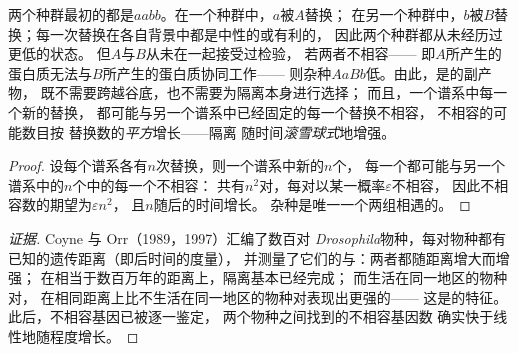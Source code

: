 \begin{theorem}\label{thm:b2:speciation:dm}
两个种群最初的都是$aabb$。在一个种群中，$a$被$A$替换；
在另一个种群中，$b$被$B$替换；每一次替换在各自背景中都是中性的或有利的，
因此两个种群都从未经历过更低的状态。
但$A$与$B$从未在一起接受过检验，
若两者不相容——
即$A$所产生的蛋白质无法与$B$所产生的蛋白质协同工作——
则杂种$AaBb$低。由此，是的副产物，
既不需要跨越谷底，也不需要为隔离本身进行选择；
而且，一个谱系中每一个新的替换，
都可能与另一个谱系中已经固定的每一个替换不相容，
不相容的可能数目按
替换数的\emph{平方}增长——隔离
随时间\emph{滚雪球式}地增强。
\end{theorem}
\begin{proof}
设每个谱系各有$n$次替换，则一个谱系中新的$n$个，
每一个都可能与另一个谱系中的$n$个中的每一个不相容：
共有$n^{2}$对，每对以某一概率$\varepsilon$不相容，
因此不相容数的期望为$\varepsilon n^{2}$，
且$n$随后的时间增长。
杂种是唯一一个两组相遇的。
\end{proof}
\begin{proof}[证据]
Coyne 与 Orr（1989，1997）汇编了数百对
\emph{Drosophila}物种，每对物种都有已知的遗传距离（即后时间的度量），
并测量了它们的与：两者都随距离增大而增强；
在相当于数百万年的距离上，隔离基本已经完成；
而生活在同一地区的物种对，
在相同距离上比不生活在同一地区的物种对表现出更强的——
这是的特征。
此后，不相容基因已被逐一鉴定，
两个物种之间找到的不相容基因数
确实快于线性地随程度增长。
\end{proof}

